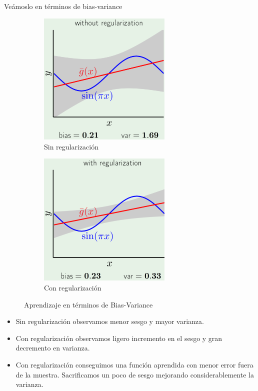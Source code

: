 \documentclass[11pt,a4paper]{article}
\theoremstyle{definition}
\begin{document}
	Veámoslo en términos de bias-variance
	\begin{figure}[H]
		\centering
		\begin{subfigure}{.5\textwidth}
  		\centering
  		\includegraphics[width=0.7\textwidth]{images/bias_var_without_reg}
  		\caption{Sin regularización}
  		\label{fig:sub1}
		\end{subfigure}%
		\begin{subfigure}{.5\textwidth}
  		\centering
  		\includegraphics[width=0.7\textwidth]{images/bias_var_with_reg}
  		\caption{Con regularización}
  		\label{fig:sub2}
		\end{subfigure}
		\caption{Aprendizaje en términos de Bias-Variance}
		\label{fig:test}
	\end{figure}
	\begin{itemize}
		\item Sin regularización observamos menor sesgo y mayor varianza.
		\item Con regularización observamos ligero incremento en el sesgo y gran decremento en varianza.
		\item Con regularización conseguimos una función aprendida con menor error fuera de la muestra. Sacrificamos un poco de sesgo mejorando considerablemente la varianza.
	\end{itemize}
	
\end{document}
